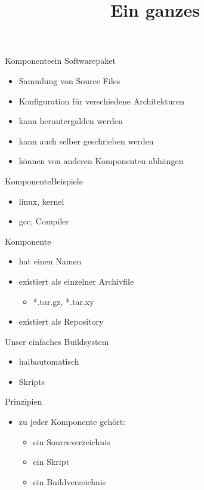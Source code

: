 \documentclass{beamer}
\begin{document}
\title[Build Again]{Ein ganzes \linux}

\begin{frame}{Komponente}{ein Softwarepaket}
 \begin{itemize}
  \item Sammlung von Source Files
  \item Konfiguration für verschiedene Architekturen
  \item kann heruntergalden werden
  \item kann auch selber geschrieben werden
  \item können von anderen Komponenten abhängen
 \end{itemize}
\end{frame}

\begin{frame}{Komponente}{Beispiele}
 \begin{itemize}
  \item linux, kernel
  \item gcc, Compiler 
 \end{itemize}
\end{frame}

\begin{frame}{Komponente}
 \begin{itemize}
  \item hat einen Namen
  \item existiert als einzelner Archivfile 
  \begin{itemize}
   \item *.tar.gz, *.tar.xy 
  \end{itemize}
  \item existiert als Repository
 \end{itemize}
\end{frame}

\begin{frame}{Unser einfaches Buildsystem}
 \begin{itemize}
  \item halbautomatisch
  \item Skripts
 \end{itemize}
\end{frame}

\begin{frame}{Prinzipien}
 \begin{itemize}
  \item zu jeder Komponente gehört:
  \begin{itemize}
   \item ein Sourceverzeichnis
   \item ein Skript
   \item ein Buildverzeichnis
  \end{itemize}
 \end{itemize}
\end{frame}
\end{document}
